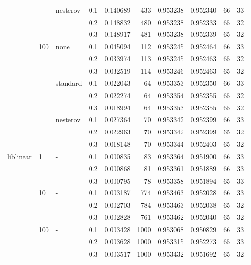 \begin{table}[H]
\begin{tabular}{llllrrrrrr}
          &     & nesterov & 0.1 &  0.140689 &     433 &  0.953238 &  0.952340 &          66 &        33 \\
          &     &   & 0.2 &  0.148832 &     480 &  0.953238 &  0.952333 &          65 &        32 \\
          &     &   & 0.3 &  0.148917 &     481 &  0.953238 &  0.952339 &          65 &        32 \\
          & 100 & none & 0.1 &  0.045094 &     112 &  0.953245 &  0.952464 &          66 &        33 \\
          &     &   & 0.2 &  0.033974 &     113 &  0.953245 &  0.952463 &          65 &        32 \\
          &     &   & 0.3 &  0.032519 &     114 &  0.953246 &  0.952463 &          65 &        32 \\
          &     & standard & 0.1 &  0.022043 &      64 &  0.953353 &  0.952350 &          66 &        33 \\
          &     &   & 0.2 &  0.022274 &      64 &  0.953354 &  0.952355 &          65 &        32 \\
          &     &   & 0.3 &  0.018994 &      64 &  0.953353 &  0.952355 &          65 &        32 \\
          &     & nesterov & 0.1 &  0.027364 &      70 &  0.953342 &  0.952399 &          66 &        33 \\
          &     &   & 0.2 &  0.022963 &      70 &  0.953342 &  0.952399 &          65 &        32 \\
          &     &   & 0.3 &  0.018148 &      70 &  0.953344 &  0.952403 &          65 &        32 \\
liblinear & 1   & - & 0.1 &  0.000835 &      83 &  0.953364 &  0.951900 &          66 &        33 \\
          &     &   & 0.2 &  0.000868 &      81 &  0.953361 &  0.951889 &          66 &        33 \\
          &     &   & 0.3 &  0.000795 &      78 &  0.953358 &  0.951894 &          65 &        33 \\
          & 10  & - & 0.1 &  0.003187 &     774 &  0.953463 &  0.952028 &          66 &        33 \\
          &     &   & 0.2 &  0.002703 &     784 &  0.953463 &  0.952038 &          65 &        32 \\
          &     &   & 0.3 &  0.002828 &     761 &  0.953462 &  0.952040 &          65 &        32 \\
          & 100 & - & 0.1 &  0.003428 &    1000 &  0.953068 &  0.950829 &          66 &        33 \\
          &     &   & 0.2 &  0.003628 &    1000 &  0.953315 &  0.952273 &          65 &        33 \\
          &     &   & 0.3 &  0.003517 &    1000 &  0.953432 &  0.951692 &          65 &        32 \\
\bottomrule
\end{tabular}
\end{table}
